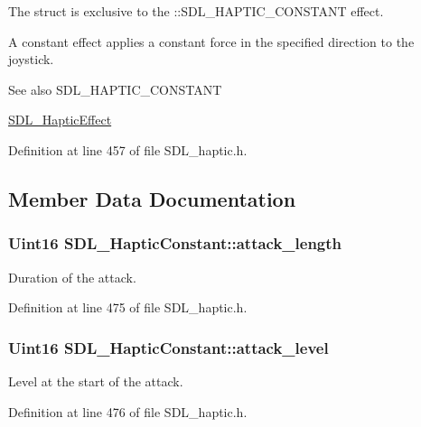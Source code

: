 The struct is exclusive to the \+::\+S\+D\+L\+\_\+\+H\+A\+P\+T\+I\+C\+\_\+\+C\+O\+N\+S\+T\+A\+N\+T effect.

A constant effect applies a constant force in the specified direction to the joystick.

\begin{DoxySeeAlso}{See also}
S\+D\+L\+\_\+\+H\+A\+P\+T\+I\+C\+\_\+\+C\+O\+N\+S\+T\+A\+N\+T 

\hyperlink{unionSDL__HapticEffect}{S\+D\+L\+\_\+\+Haptic\+Effect} 
\end{DoxySeeAlso}


Definition at line 457 of file S\+D\+L\+\_\+haptic.\+h.



\subsection{Member Data Documentation}
\hypertarget{structSDL__HapticConstant_a907bade68ab53fb24e7d2651d19b767f}{
\subsubsection[{attack\+\_\+length}]{\setlength{\rightskip}{0pt plus 5cm}Uint16 S\+D\+L\+\_\+\+Haptic\+Constant\+::attack\+\_\+length}}\label{structSDL__HapticConstant_a907bade68ab53fb24e7d2651d19b767f}
Duration of the attack. 

Definition at line 475 of file S\+D\+L\+\_\+haptic.\+h.

\hypertarget{structSDL__HapticConstant_a0928a37f3fab0e5b7daffc7a1d65744c}{
\subsubsection[{attack\+\_\+level}]{\setlength{\rightskip}{0pt plus 5cm}Uint16 S\+D\+L\+\_\+\+Haptic\+Constant\+::attack\+\_\+level}}\label{structSDL__HapticConstant_a0928a37f3fab0e5b7daffc7a1d65744c}
Level at the start of the attack. 

Definition at line 476 of file S\+D\+L\+\_\+haptic.\+h.

